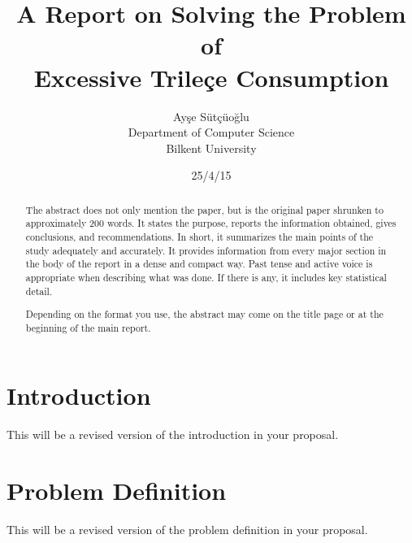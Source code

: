 \documentclass[peerreview]{IEEEtran}
\begin{document}
\title{A Report on Solving the Problem of \\ Excessive Trileçe Consumption}



\author{Ayşe Sütçüoğlu \\
Department of Computer Science\\
Bilkent University\\
}
\date{25/4/15}

\maketitle
\tableofcontents
\listoffigures
\listoftables

\IEEEpeerreviewmaketitle
\begin{abstract}
The abstract does not only mention the paper, but is the original paper shrunken to approximately 200 words. It states the purpose, reports the information obtained, gives conclusions, and recommendations. In short, it summarizes the main points of the study adequately and accurately. It provides information from every major section in the body of the report in a dense and compact way. Past tense and active voice is appropriate when describing what was done. If there is any, it includes key statistical detail.  

Depending on the format you use, the abstract may come on the title page or at the beginning of the main report.

\end{abstract}





\section{Introduction}
This will be a revised version of the introduction in your proposal.

\section{Problem Definition}
This will be a revised version of the problem definition in your proposal.
\end{document}
